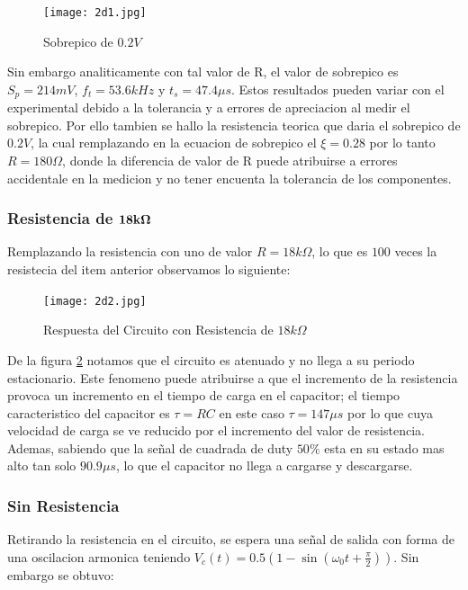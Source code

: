 \begin{figure}[h!]
\centering
\texttt{[image: 2d1.jpg]}
\caption{Sobrepico de $0.2V$}
\label{fig:LRC2d1}
\end{figure}

Sin embargo analiticamente con tal valor de R, el valor de sobrepico es $S_p = 214mV$, $f_t= 53.6kHz$ y $t_s = 47.4{\mu}s$. Estos resultados pueden variar con el experimental debido a la tolerancia y a errores de apreciacion al medir el sobrepico. Por ello tambien se hallo la resistencia teorica que daria el sobrepico de $0.2V$, la cual remplazando en la ecuacion de sobrepico el $\xi=0.28$ por lo tanto $R=180\Omega$, donde la diferencia de valor de R puede atribuirse a errores accidentale en la medicion y no tener encuenta la tolerancia de los componentes. 

\subsubsection{Resistencia de $\bold{18k\Omega}$}

Remplazando la resistencia con uno de valor $R=18k\Omega$, lo que es $100$ veces la resistecia del item anterior observamos lo siguiente:

\begin{figure}[h!]
\centering
\texttt{[image: 2d2.jpg]}
\caption{Respuesta del Circuito con Resistencia de $18k\Omega$} 	
\label{fig:LRC2d2}
\end{figure}

De la figura \ref{fig:LRC2d2} notamos que el circuito es atenuado y no llega a su periodo estacionario. Este fenomeno puede atribuirse a que el incremento de la resistencia provoca un incremento en el tiempo de carga en el capacitor; el tiempo caracteristico del capacitor es $\tau = RC$ en este caso $\tau = 147{\mu}s$ por lo que cuya velocidad de carga se ve reducido por el incremento del valor de resistencia. Ademas, sabiendo que la señal de cuadrada de duty $50\%$ esta en su estado mas alto tan solo $90.9{\mu}s$, lo que el capacitor no llega a cargarse y descargarse. 

\subsubsection{Sin Resistencia}\label{dsinresistencia}

Retirando la resistencia en el circuito, se espera una señal de salida con forma de una oscilacion armonica teniendo $V_c(t) = 0.5\left(1-\sin{\left(\omega_0t+\frac{\pi}{2}\right)}\right)$. Sin embargo se obtuvo:

